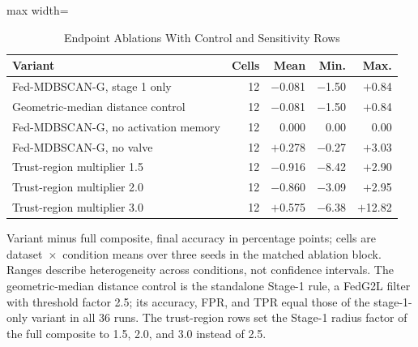 \begin{table}[!t]
\centering\footnotesize
\setlength{\tabcolsep}{4pt}
\caption{Endpoint Ablations With Control and Sensitivity Rows}\label{tab:ablation_full}
\begin{adjustbox}{max width=\columnwidth}
\begin{tabular}{lrrrr}
\toprule
Variant & Cells & Mean & Min. & Max. \\
\midrule
Fed-MDBSCAN-G, stage 1 only & 12 & $-$0.081 & $-$1.50 & $+$0.84 \\
Geometric-median distance control & 12 & $-$0.081 & $-$1.50 & $+$0.84 \\
Fed-MDBSCAN-G, no activation memory & 12 & 0.000 & 0.00 & 0.00 \\
Fed-MDBSCAN-G, no valve & 12 & $+$0.278 & $-$0.27 & $+$3.03 \\
Trust-region multiplier 1.5 & 12 & $-$0.916 & $-$8.42 & $+$2.90 \\
Trust-region multiplier 2.0 & 12 & $-$0.860 & $-$3.09 & $+$2.95 \\
Trust-region multiplier 3.0 & 12 & $+$0.575 & $-$6.38 & $+$12.82 \\
\bottomrule
\end{tabular}
\end{adjustbox}

\par\vspace{3pt}\parbox{\linewidth}{\footnotesize Variant minus full composite, final accuracy in percentage points; cells are dataset~$\times$~condition means over three seeds in the matched ablation block. Ranges describe heterogeneity across conditions, not confidence intervals. The geometric-median distance control is the standalone Stage-1 rule, a FedG2L filter with threshold factor 2.5; its accuracy, FPR, and TPR equal those of the stage-1-only variant in all 36 runs. The trust-region rows set the Stage-1 radius factor of the full composite to 1.5, 2.0, and 3.0 instead of 2.5.}
\end{table}
